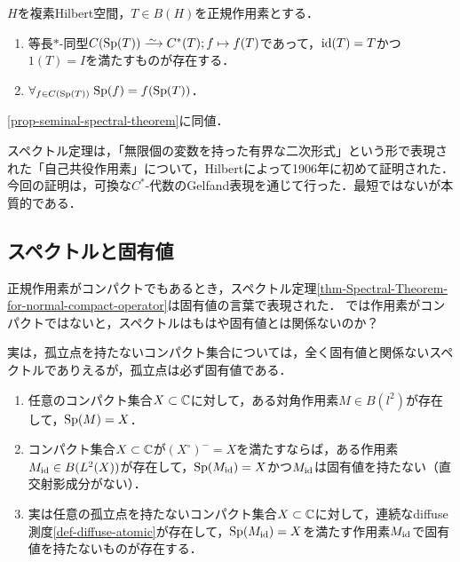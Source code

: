 \documentclass[uplatex,dvipdfmx]{jsreport}
\begin{document}
\begin{theorem}
    $H$を複素Hilbert空間，$T\in B(H)$を正規作用素とする．
    \begin{enumerate}
        \item 等長$*$-同型$C(\Sp(T))\iso C^*(T);f\mapsto f(T)$であって，$\mathrm{id}(T)=T$かつ$1(T)=I$を満たすものが存在する．
        \item $\forall_{f\in C(\mathrm{Sp}(T))}\;\mathrm{Sp}(f)=f(\mathrm{Sp}(T))$．
    \end{enumerate}
\end{theorem}
\begin{Proof}
    \ref{prop-seminal-spectral-theorem}に同値．
\end{Proof}

\begin{history}
    スペクトル定理は，「無限個の変数を持った有界な二次形式」という形で表現された「自己共役作用素」について，Hilbertによって1906年に初めて証明された．
    今回の証明は，可換な$C^*$-代数のGelfand表現を通じて行った．最短ではないが本質的である．
\end{history}

\subsection{スペクトルと固有値}

\begin{tcolorbox}[colframe=ForestGreen, colback=ForestGreen!10!white,breakable,colbacktitle=ForestGreen!40!white,coltitle=black,fonttitle=\bfseries\sffamily,
title=]
    正規作用素がコンパクトでもあるとき，スペクトル定理\ref{thm-Spectral-Theorem-for-normal-compact-operator}は固有値の言葉で表現された．
    では作用素がコンパクトではないと，スペクトルはもはや固有値とは関係ないのか？

    実は，孤立点を持たないコンパクト集合については，全く固有値と関係ないスペクトルでありえるが，孤立点は必ず固有値である．
\end{tcolorbox}

\begin{lemma}\mbox{}
    \begin{enumerate}
        \item 任意のコンパクト集合$X\subset\mathbb{C}$に対して，ある対角作用素$M\in B(l^2)$が存在して，$\mathrm{Sp}(M)=X$．
        \item コンパクト集合$X\subset\mathbb{C}$が$(X^\circ)^-=X$を満たすならば，ある作用素$M_{\mathrm{id}}\in B(L^2(X))$が存在して，$\mathrm{Sp}(M_{\mathrm{id}})=X$かつ$M_{\mathrm{id}}$は固有値を持たない（直交射影成分がない）．
        \item 実は任意の孤立点を持たないコンパクト集合$X\subset\mathbb{C}$に対して，連続なdiffuse測度\ref{def-diffuse-atomic}が存在して，$\mathrm{Sp}(M_{\mathrm{id}})=X$を満たす作用素$M_{\mathrm{id}}$で固有値を持たないものが存在する．
    \end{enumerate}
\end{lemma}
\end{document}
